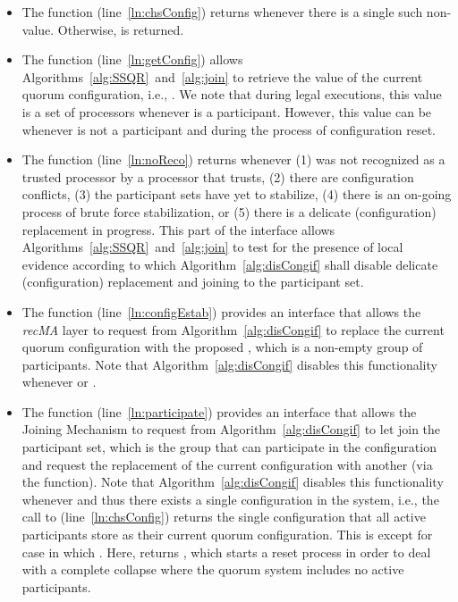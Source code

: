 \documentclass[11pt]{article}
\newcommand{\noReconfig}{noReco}
\begin{document}
\begin{itemize}

\item The function  (line~\ref{ln:chsConfig}) returns  whenever there is a single such non- value. Otherwise,  is returned.

\item The function  (line~\ref{ln:getConfig}) allows Algorithms~\ref{alg:SSQR}~and~\ref{alg:join} to retrieve the value of the current quorum configuration, i.e., . We note that during legal executions, this value is a set of processors whenever  is a participant. However, this value can be  whenever  is not a participant and  during the process of configuration reset.

\item The function  (line~\ref{ln:\noReconfig}) returns  whenever (1)  was not recognized as a trusted processor by a processor that  trusts, (2) there are configuration conflicts, (3) the participant sets have yet to stabilize, (4) there is an on-going process of brute force stabilization, or (5) there is a delicate (configuration) replacement in progress. This part of the interface allows Algorithms~\ref{alg:SSQR}~and~\ref{alg:join} to test for the presence of local evidence according to which Algorithm~\ref{alg:disCongif} shall disable delicate (configuration) replacement and joining to the participant set.


\item The function  (line~\ref{ln:configEstab}) provides an interface that allows the \emph{recMA} layer to request from Algorithm~\ref{alg:disCongif} to replace the current quorum configuration with the proposed , which is a non-empty group of participants. Note that Algorithm~\ref{alg:disCongif} disables this functionality whenever  or .


\item The function  (line~\ref{ln:participate}) provides an interface that allows the Joining Mechanism to request from Algorithm~\ref{alg:disCongif} to let  join the participant set, which is the group that can participate in the configuration and request the replacement of the current configuration with another (via the  function). Note that Algorithm~\ref{alg:disCongif} disables this functionality whenever  and thus there exists a single configuration in the system, i.e., the call to  (line~\ref{ln:chsConfig}) returns the single configuration that all active participants store as their current quorum configuration. This is except for case in which . Here,  returns , which starts a reset process in order to deal with a complete collapse where the quorum system includes no active participants. 




\end{itemize}
\end{document}

